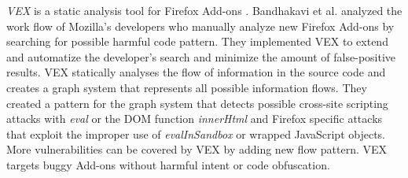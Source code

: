 	\textit{VEX} is a static analysis tool for Firefox Add-ons \cite{Bandhakavi:2011:VBE:1995376.1995398}. Bandhakavi et al. analyzed the work flow of Mozilla's developers who manually analyze new Firefox Add-ons by searching for possible harmful code pattern. They implemented VEX to extend and automatize the developer's search and minimize the amount of false-positive results. VEX statically analyses the flow of information in the source code and creates a graph system that represents all possible information flows. They created a pattern for the graph system that detects possible cross-site scripting attacks with \textit{eval} or the DOM function \textit{innerHtml} and Firefox specific attacks that exploit the improper use of \textit{evalInSandbox} or wrapped JavaScript objects. More vulnerabilities can be covered by VEX by adding new flow pattern. VEX targets buggy Add-ons without harmful intent or code obfuscation. 
	